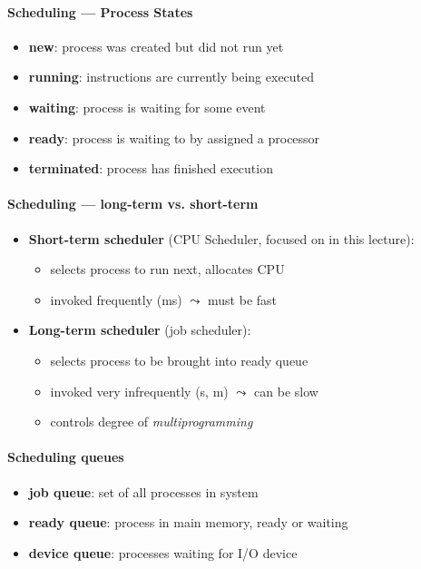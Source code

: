 \paragraph{Scheduling --- Process States}
\begin{itemize}
  \item \textbf{new}: process was created but did not run yet
  \item \textbf{running}: instructions are currently being executed
  \item \textbf{waiting}: process is waiting for some event
  \item \textbf{ready}: process is waiting to by assigned a processor
  \item \textbf{terminated}: process has finished execution
\end{itemize}

\paragraph{Scheduling --- long-term vs. short-term}
\begin{itemize}
  \item \textbf{Short-term scheduler} (CPU Scheduler, focused on in this lecture):
  \begin{itemize}
    \item selects process to run next, allocates CPU
    \item invoked frequently (ms) \( \leadsto \) must be fast
  \end{itemize}
  \item \textbf{Long-term scheduler} (job scheduler):
  \begin{itemize}
    \item selects process to be brought into ready queue
    \item invoked very infrequently (s, m) \( \leadsto \) can be slow
    \item controls degree of \emph{multiprogramming}
  \end{itemize}
\end{itemize}

\paragraph{Scheduling queues}
\begin{itemize}
  \item \textbf{job queue}: set of all processes in system
  \item \textbf{ready queue}: process in main memory, ready or waiting
  \item \textbf{device queue}: processes waiting for I/O device
\end{itemize}

